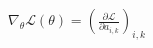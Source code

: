 \documentclass[preview]{standalone}
\begin{document}
\begin{align*}
\nabla _ \theta  \mathcal{L}( \theta ) = ( \frac{\partial \mathcal{L}}{\partial a_{i,k}} )_{i,k}
\end{align*}
\end{document}
